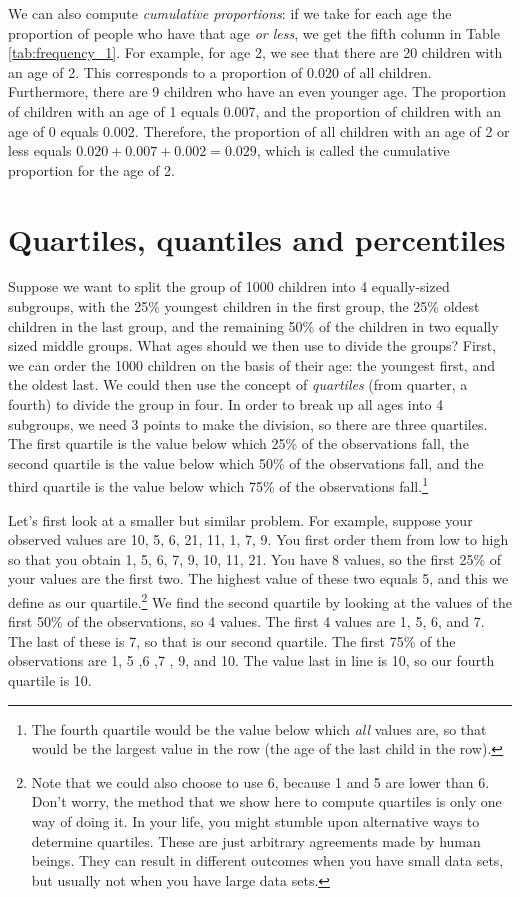 \documentclass[]{book}\usepackage[]{graphicx}\usepackage[]{color}
\begin{document}
We can also compute \textit{cumulative proportions}: if we take for each age the proportion of people who have that age \textit{or less}, we get the fifth column in Table \ref{tab:frequency_1}. For example, for age 2, we see that there are 20 children with an age of 2. This corresponds to a proportion of 0.020 of all children. Furthermore, there are 9 children who have an even younger age. The proportion of children with an age of 1 equals 0.007, and the proportion of children with an age of 0 equals 0.002. Therefore, the proportion of all children with an age of 2 or less equals $0.020+0.007+0.002=0.029$, which is called the cumulative proportion for the age of 2.



\section{Quartiles, quantiles and percentiles}

Suppose we want to split the group of 1000 children into 4 equally-sized subgroups, with the 25\% youngest children in the first group, the 25\% oldest children in the last group, and the remaining 50\% of the children in two equally sized middle groups. What ages should we then use to divide the groups? First, we can order the 1000 children on the basis of their age: the youngest first, and the oldest last. We could then use the concept of \textit{quartiles} (from quarter, a fourth) to divide the group in four. In order to break up all ages into 4 subgroups, we need 3 points to make the division, so there are three quartiles. The first quartile is the value below which 25\% of the observations fall, the second quartile is the value below which 50\% of the observations fall, and the third quartile is the value below which 75\% of the observations fall.\footnote{The fourth quartile would be the value below which \textit{all} values are, so that would be the largest value in the row (the age of the last child in the row).}

Let's first look at a smaller but similar problem. For example, suppose your observed values are {10, 5, 6, 21, 11, 1, 7, 9}. You first order them from low to high so that you obtain {1, 5, 6, 7, 9, 10, 11, 21}. You have 8 values, so the first 25\% of your values are the first two. The highest value of these two equals 5, and this we define as our quartile.\footnote{Note that we could also choose to use 6,
because 1 and 5 are lower than 6. Don't worry, the method that we show here to compute quartiles is only one way of doing it. In your life, you might stumble upon alternative ways to determine quartiles. These are just arbitrary agreements made by human beings. They can result in different outcomes when you have small data sets, but usually not when you have large data sets.} We find the second quartile by looking at the values of the first 50\% of the observations, so 4 values. The first 4 values are 1, 5, 6, and 7. The last of these is 7, so that is our second quartile. The first 75\% of the observations are 1, 5 ,6 ,7 , 9, and 10. The value last in line is 10, so our fourth quartile is 10.
\end{document}
